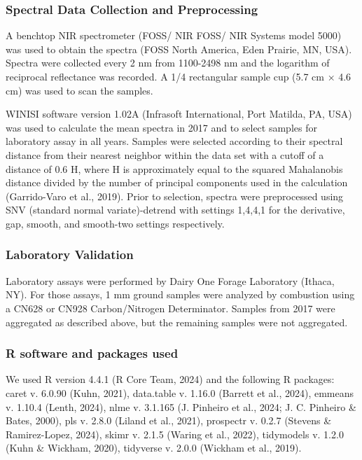 \documentclass[
]{agujournal2019}
\begin{document}
\subsubsection{Spectral Data Collection and
Preprocessing}\label{spectral-data-collection-and-preprocessing}

A benchtop NIR spectrometer (FOSS/ NIR FOSS/ NIR Systems model 5000) was
used to obtain the spectra (FOSS North America, Eden Prairie, MN, USA).
Spectra were collected every 2 nm from 1100-2498 nm and the logarithm of
reciprocal reflectance was recorded. A 1/4 rectangular sample cup (5.7
cm × 4.6 cm) was used to scan the samples.

WINISI software version 1.02A (Infrasoft International, Port Matilda,
PA, USA) was used to calculate the mean spectra in 2017 and to select
samples for laboratory assay in all years. Samples were selected
according to their spectral distance from their nearest neighbor within
the data set with a cutoff of a distance of 0.6 H, where H is
approximately equal to the squared Mahalanobis distance divided by the
number of principal components used in the calculation (Garrido-Varo et
al., 2019). Prior to selection, spectra were preprocessed using SNV
(standard normal variate)-detrend with settings 1,4,4,1 for the
derivative, gap, smooth, and smooth-two settings respectively.

\subsubsection{Laboratory Validation}\label{laboratory-validation}

Laboratory assays were performed by Dairy One Forage Laboratory (Ithaca,
NY). For those assays, 1 mm ground samples were analyzed by combustion
using a CN628 or CN928 Carbon/Nitrogen Determinator. Samples from 2017
were aggregated as described above, but the remaining samples were not
aggregated.

\subsubsection{R software and packages
used}\label{r-software-and-packages-used}

We used R version 4.4.1 (R Core Team, 2024) and the following R
packages: caret v. 6.0.90 (Kuhn, 2021), data.table v. 1.16.0 (Barrett et
al., 2024), emmeans v. 1.10.4 (Lenth, 2024), nlme v. 3.1.165 (J.
Pinheiro et al., 2024; J. C. Pinheiro \& Bates, 2000), pls v. 2.8.0
(Liland et al., 2021), prospectr v. 0.2.7 (Stevens \& Ramirez-Lopez,
2024), skimr v. 2.1.5 (Waring et al., 2022), tidymodels v. 1.2.0 (Kuhn
\& Wickham, 2020), tidyverse v. 2.0.0 (Wickham et al., 2019).
\end{document}
